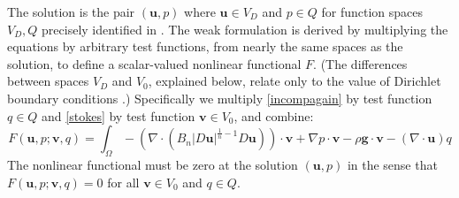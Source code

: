 \documentclass[letterpaper,final,12pt,reqno]{amsart}
\newcommand{\bu}{\mathbf{u}}
\newcommand{\bv}{\mathbf{v}}
\begin{document}
The solution is the pair $(\bu,p)$ where $\bu\in V_D$ and $p \in Q$ for function spaces $V_D,Q$ precisely identified in \cite{JouvetRappaz2011}.  The weak formulation is derived by multiplying the equations by arbitrary test functions, from nearly the same spaces as the solution, to define a scalar-valued nonlinear functional $F$.  (The differences between spaces $V_D$ and $V_0$, explained below, relate only to the value of Dirichlet boundary conditions \cite{JouvetRappaz2011}.)  Specifically we multiply \eqref{incompagain} by test function $q\in Q$ and \eqref{stokes} by test function $\bv\in V_0$, and combine:
\begin{equation}
F(\bu,p;\bv,q) = \int_\Omega - \left(\nabla \cdot \left(B_n |D\bu|^{\frac{1}{n} - 1} D\bu\right)\right)\cdot \bv + \nabla p \cdot \bv - \rho \mathbf{g} \cdot \bv - \left(\nabla \cdot \bu\right) q \label{nonfuncone}
\end{equation}
The nonlinear functional must be zero at the solution $(\bu,p)$ in the sense that $F(\bu,p;\bv,q) = 0$ for all  $\bv\in V_0$ and $q\in Q$.
\end{document}
